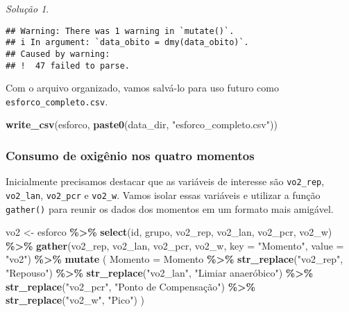 \documentclass[
]{latex/krantz}
\newenvironment{Shaded}{\begin{snugshade}}{\end{snugshade}}
\newcommand{\AttributeTok}[1]{\textcolor[rgb]{0.13,0.29,0.53}{#1}}
\newcommand{\FunctionTok}[1]{\textcolor[rgb]{0.13,0.29,0.53}{\textbf{#1}}}
\newcommand{\NormalTok}[1]{#1}
\newcommand{\OtherTok}[1]{\textcolor[rgb]{0.56,0.35,0.01}{#1}}
\newcommand{\SpecialCharTok}[1]{\textcolor[rgb]{0.81,0.36,0.00}{\textbf{#1}}}
\newcommand{\StringTok}[1]{\textcolor[rgb]{0.31,0.60,0.02}{#1}}
\theoremstyle{definition}
\theoremstyle{definition}
\theoremstyle{definition}
\theoremstyle{definition}
\theoremstyle{remark}
\newtheorem*{solution}{Solução}
\begin{document}
\begin{solution}
\begin{verbatim}
## Warning: There was 1 warning in `mutate()`.
## i In argument: `data_obito = dmy(data_obito)`.
## Caused by warning:
## !  47 failed to parse.
\end{verbatim}

Com o arquivo organizado, vamos salvá-lo para uso futuro como \texttt{esforco\_completo.csv}.

\begin{Shaded}
\begin{Highlighting}[]
\FunctionTok{write\_csv}\NormalTok{(esforco, }\FunctionTok{paste0}\NormalTok{(data\_dir, }\StringTok{"esforco\_completo.csv"}\NormalTok{))}
\end{Highlighting}
\end{Shaded}

\hypertarget{consumo-de-oxiguxeanio-nos-quatro-momentos}{%
\subsubsection*{Consumo de oxigênio nos quatro momentos}\label{consumo-de-oxiguxeanio-nos-quatro-momentos}}

Inicialmente precisamos destacar que as variáveis de interesse são \texttt{vo2\_rep}, \texttt{vo2\_lan}, \texttt{vo2\_pcr} e \texttt{vo2\_w}. Vamos isolar essas variáveis e utilizar a função \texttt{gather()} para reunir os dados dos momentos em um formato mais amigável.

\begin{Shaded}
\begin{Highlighting}[]
\NormalTok{vo2 }\OtherTok{\textless{}{-}}\NormalTok{ esforco }\SpecialCharTok{\%\textgreater{}\%}
          \FunctionTok{select}\NormalTok{(id, grupo, vo2\_rep, vo2\_lan, vo2\_pcr, vo2\_w) }\SpecialCharTok{\%\textgreater{}\%}
          \FunctionTok{gather}\NormalTok{(vo2\_rep, vo2\_lan, vo2\_pcr, vo2\_w, }\AttributeTok{key =} \StringTok{"Momento"}\NormalTok{, }\AttributeTok{value =} \StringTok{"vo2"}\NormalTok{) }\SpecialCharTok{\%\textgreater{}\%}
          \FunctionTok{mutate}\NormalTok{ (}
            \AttributeTok{Momento =}\NormalTok{ Momento }\SpecialCharTok{\%\textgreater{}\%} 
                        \FunctionTok{str\_replace}\NormalTok{(}\StringTok{"vo2\_rep"}\NormalTok{, }\StringTok{"Repouso"}\NormalTok{) }\SpecialCharTok{\%\textgreater{}\%}
                        \FunctionTok{str\_replace}\NormalTok{(}\StringTok{"vo2\_lan"}\NormalTok{, }\StringTok{"Limiar anaeróbico"}\NormalTok{) }\SpecialCharTok{\%\textgreater{}\%}
                        \FunctionTok{str\_replace}\NormalTok{(}\StringTok{"vo2\_pcr"}\NormalTok{, }\StringTok{"Ponto de Compensação"}\NormalTok{) }\SpecialCharTok{\%\textgreater{}\%}
                        \FunctionTok{str\_replace}\NormalTok{(}\StringTok{"vo2\_w"}\NormalTok{, }\StringTok{"Pico"}\NormalTok{)}
\NormalTok{         )}
  

\end{Highlighting}
\end{Shaded}
\end{solution}
\end{document}
